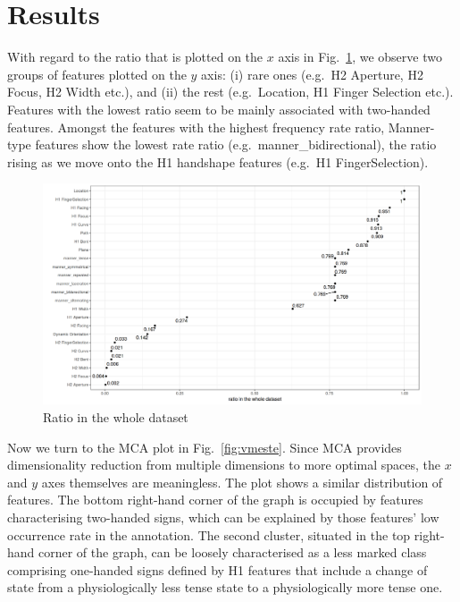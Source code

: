 \hypertarget{sec:results}{%
\section{Results}\label{sec:results}}

With regard to the ratio that is plotted on the \(x\) axis in
Fig.~\ref{fig:ratio}, we observe two groups of features plotted on the
\(y\) axis: (i) rare ones (e.g.~H2 Aperture, H2 Focus, H2 Width etc.),
and (ii) the rest (e.g.~Location, H1 Finger Selection etc.). Features
with the lowest ratio seem to be mainly associated with two-handed
features. Amongst the features with the highest frequency rate ratio,
Manner-type features show the lowest rate ratio
(e.g.~manner\_bidirectional), the ratio rising as we move onto the H1
handshape features (e.g.~H1 FingerSelection).

\begin{figure}
\hypertarget{fig:ratio}{%
\centering
\includegraphics{ratio.png}
\caption{Ratio in the whole dataset}\label{fig:ratio}
}
\end{figure}

Now we turn to the MCA plot in Fig.~\ref{fig:vmeste}. Since MCA provides
dimensionality reduction from multiple dimensions to more optimal
spaces, the \(x\) and \(y\) axes themselves are meaningless. The plot
shows a similar distribution of features. The bottom right-hand corner
of the graph is occupied by features characterising two-handed signs,
which can be explained by those features' low occurrence rate in the
annotation. The second cluster, situated in the top right-hand corner of
the graph, can be loosely characterised as a less marked class
comprising one-handed signs defined by H1 features that include a change
of state from a physiologically less tense state to a physiologically
more tense one.

